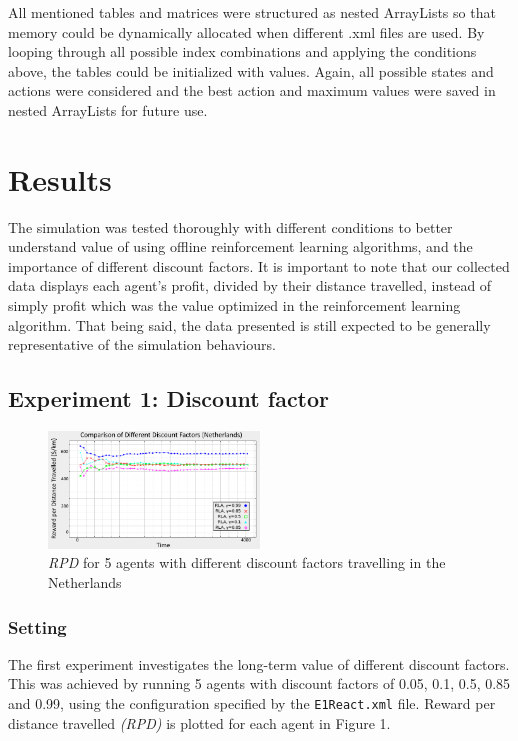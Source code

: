 \documentclass[11pt]{article}
\begin{document}
All mentioned tables and matrices were structured as nested ArrayLists so that memory could be dynamically allocated when different .xml files are used. By looping through all possible index combinations and applying the conditions above, the tables could be initialized with values. Again, all possible states and actions were considered and the best action and maximum values were saved in nested ArrayLists for future use. 

\section{Results}
The simulation was tested thoroughly with different conditions to better understand value of using offline reinforcement learning algorithms, and the importance of different discount factors. It is important to note that our collected data displays each agent's profit, divided by their distance travelled, instead of simply profit which was the value optimized in the reinforcement learning algorithm. That being said, the data presented is still expected to be generally representative of the simulation behaviours. 
\subsection{Experiment 1: Discount factor}
\begin{figure}
	\centering
	\includegraphics[width=0.5\textwidth]{p1}
	\caption{\textit{RPD} for 5 agents with different discount factors travelling in the Netherlands}
	\label{figure:1}
\end{figure}
\subsubsection{Setting}
The first experiment investigates the long-term value of different discount factors. This was achieved by running 5 agents with discount factors of 0.05, 0.1, 0.5, 0.85 and 0.99, using the configuration specified by the \texttt{E1React.xml} file. Reward per distance travelled \textit{(RPD)} is plotted for each agent in Figure 1.
\end{document}
